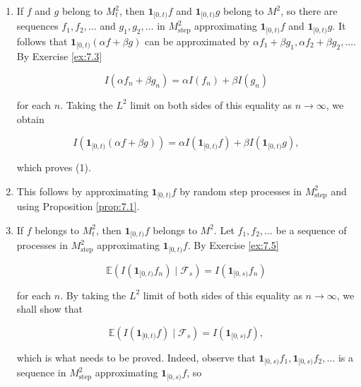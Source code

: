 \begin{Proof}
\begin{enumerate}
\item If $f$ and $g$ belong to $M_t^2$, then $\mathbf{1}_{[0,t)}f$ and $\mathbf{1}_{[0,t)}g$ belong to $M^2$, so there are sequences $f_1, f_2, \ldots$ and $g_1, g_2, \ldots$ in $M_{\mathrm{step}}^2$ approximating $\mathbf{1}_{[0,t)}f$ and $\mathbf{1}_{[0,t)}g$. It follows that $\mathbf{1}_{[0,t)}(\alpha f + \beta g)$ can be approximated by $\alpha f_1 + \beta g_1, \alpha f_2 + \beta g_2, \ldots$. By Exercise \ref{ex:7.3}

\begin{equation}
I\left(\alpha f_n + \beta g_n\right) = \alpha I(f_n) + \beta I(g_n)
\end{equation}

for each $n$. Taking the $L^2$ limit on both sides of this equality as $n \to \infty$, we obtain

\begin{equation}
I\left(\mathbf{1}_{[0,t)}(\alpha f + \beta g)\right) = \alpha I\left(\mathbf{1}_{[0,t)} f\right) + \beta I\left(\mathbf{1}_{[0,t)} g\right),
\end{equation}

which proves (1).

\item This follows by approximating $\mathbf{1}_{[0,t)}f$ by random step processes in $M_{\mathrm{step}}^2$ and using Proposition \ref{prop:7.1}.

\item If $f$ belongs to $M_t^2$, then $\mathbf{1}_{[0,t)}f$ belongs to $M^2$. Let $f_1, f_2, \ldots$ be a sequence of processes in $M_{\mathrm{step}}^2$ approximating $\mathbf{1}_{[0,t)}f$. By Exercise \ref{ex:7.5}

\begin{equation}
\mathbb{E}\left(I\left(\mathbf{1}_{[0,t)} f_n\right) \mid \mathcal{F}_s\right) = I\left(\mathbf{1}_{[0,s)} f_n\right)
\label{eq:prop7_3_step}
\end{equation}

for each $n$. By taking the $L^2$ limit of both sides of this equality as $n \to \infty$, we shall show that

\begin{equation}
\mathbb{E}\left(I\left(\mathbf{1}_{[0,t)} f\right) \mid \mathcal{F}_s\right) = I\left(\mathbf{1}_{[0,s)} f\right),
\end{equation}

which is what needs to be proved. Indeed, observe that $\mathbf{1}_{[0,s)} f_1, \mathbf{1}_{[0,s)} f_2, \ldots$ is a sequence in $M_{\mathrm{step}}^2$ approximating $\mathbf{1}_{[0,s)} f$, so


\end{enumerate}
\end{Proof}
